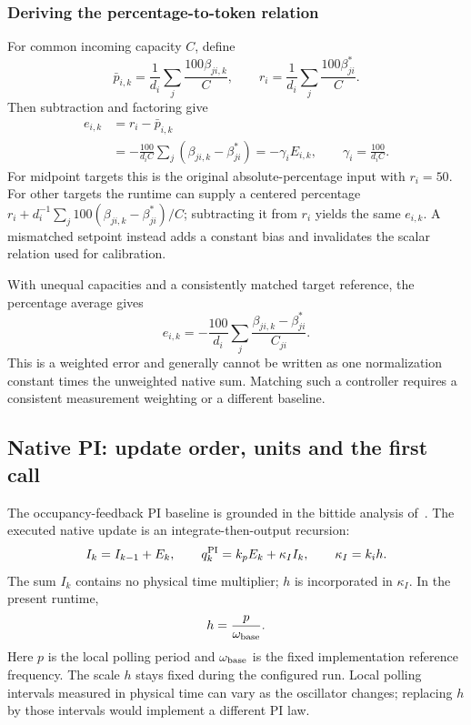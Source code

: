 \subsubsection{Deriving the percentage-to-token relation}
For common incoming capacity $C$, define
\[
 \bar p_{i,k}=\frac1{d_i}\sum_j\frac{100\beta_{ji,k}}{C},\qquad
 r_i=\frac1{d_i}\sum_j\frac{100\beta^*_{ji}}{C}.
\]
Then subtraction and factoring give
\begin{align}
 e_{i,k}&=r_i-\bar p_{i,k}\\
 &=-\frac{100}{d_iC}\sum_j(\beta_{ji,k}-\beta^*_{ji})
 =-\gamma_i E_{i,k},\qquad \gamma_i=\frac{100}{d_iC}.
 \label{eq:fpi_percent}
\end{align}
For midpoint targets this is the original absolute-percentage input with
$r_i=50$. For other targets the runtime can supply a centered percentage
$r_i+d_i^{-1}\sum_j100(\beta_{ji,k}-\beta^*_{ji})/C$; subtracting it from
$r_i$ yields the same $e_{i,k}$. A mismatched setpoint instead adds a
constant bias and invalidates the scalar relation used for calibration.

With unequal capacities and a consistently matched target reference, the
percentage average gives
\[
 e_{i,k}=-\frac{100}{d_i}\sum_j
 \frac{\beta_{ji,k}-\beta^*_{ji}}{C_{ji}}.
\]
This is a weighted error and generally cannot be written as one normalization constant
times the unweighted native sum. Matching such a controller requires a
consistent measurement weighting or a different baseline.

\subsection{Native PI: update order, units and the first call}

The occupancy-feedback PI baseline is grounded in the bittide analysis
of~\cite{lall2022resistance}. The executed native update is an
integrate-then-output recursion:
\begin{equation}
 I_k=I_{k-1}+E_k,\qquad
 q_k^{\rm PI}=k_pE_k+\kappa_I I_k,\qquad \kappa_I=k_i h.
 \label{eq:fpi_native}
\end{equation}
The sum $I_k$ contains no physical time multiplier; $h$ is incorporated in
$\kappa_I$. In the present runtime,
\begin{equation}
 h=\frac{p}{\omega_{\rm base}}.
 \label{eq:fpd_h}
\end{equation}
Here $p$ is the local polling period and $\omega_{\rm base}$ is the fixed implementation reference frequency. The scale $h$ stays fixed during the configured run. Local polling intervals measured
in physical time can vary as the oscillator changes; replacing $h$ by
those intervals would implement a different PI law.

